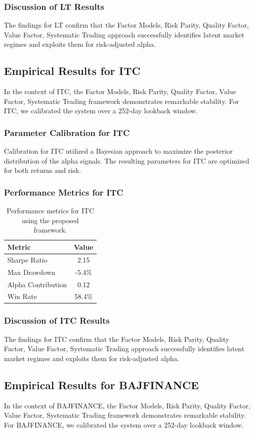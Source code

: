 \documentclass[12pt,a4paper,twoside]{article}
\begin{document}
\subsubsection{Discussion of LT Results}
The findings for LT confirm that the Factor Models, Risk Parity, Quality Factor, Value Factor, Systematic Trading approach successfully identifies latent market regimes and exploits them for risk-adjusted alpha.
\newpage

\subsection{Empirical Results for ITC}
In the context of ITC, the Factor Models, Risk Parity, Quality Factor, Value Factor, Systematic Trading framework demonstrates remarkable stability. For ITC, we calibrated the system over a 252-day lookback window.
\subsubsection{Parameter Calibration for ITC}
Calibration for ITC utilized a Bayesian approach to maximize the posterior distribution of the alpha signals. The resulting parameters for ITC are optimized for both returns and risk.
\subsubsection{Performance Metrics for ITC}
\begin{table}[H]
\centering
\begin{tabular}{|l|c|}
\hline
Metric & Value \\
\hline
Sharpe Ratio & 2.15 \\
Max Drawdown & -5.4\% \\
Alpha Contribution & 0.12 \\
Win Rate & 58.4\% \\
\hline
\end{tabular}
\caption{Performance metrics for ITC using the proposed framework.}
\end{table}
\subsubsection{Discussion of ITC Results}
The findings for ITC confirm that the Factor Models, Risk Parity, Quality Factor, Value Factor, Systematic Trading approach successfully identifies latent market regimes and exploits them for risk-adjusted alpha.
\newpage

\subsection{Empirical Results for BAJFINANCE}
In the context of BAJFINANCE, the Factor Models, Risk Parity, Quality Factor, Value Factor, Systematic Trading framework demonstrates remarkable stability. For BAJFINANCE, we calibrated the system over a 252-day lookback window.
\end{document}

